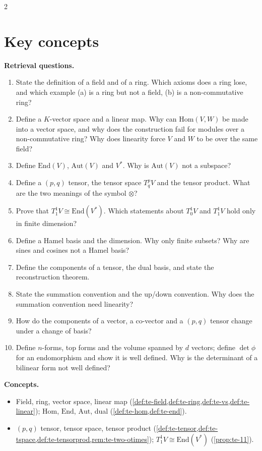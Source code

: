 \begin{paracol}{2}
\section*{Key concepts}
\begin{keyconcepts}
\textbf{Retrieval questions.}
\begin{enumerate}
  \item State the definition of a field and of a ring. Which axioms does a ring lose, and which example (a) is a ring but not a field, (b) is a non-commutative ring?
  \item Define a $K$-vector space and a linear map. Why can $\mathrm{Hom}(V,W)$ be made into a vector space, and why does the construction fail for modules over a non-commutative ring? Why does linearity force $V$ and $W$ to be over the same field?
  \item Define $\mathrm{End}(V)$, $\mathrm{Aut}(V)$ and $V^*$. Why is $\mathrm{Aut}(V)$ not a subspace?
  \item Define a $(p,q)$ tensor, the tensor space $T^p_qV$ and the tensor product. What are the two meanings of the symbol $\otimes$?
  \item Prove that $T^1_1V\cong\mathrm{End}(V^*)$. Which statements about $T^1_0V$ and $T^1_1V$ hold only in finite dimension?
  \item Define a Hamel basis and the dimension. Why only finite subsets? Why are sines and cosines not a Hamel basis?
  \item Define the components of a tensor, the dual basis, and state the reconstruction theorem.
  \item State the summation convention and the up/down convention. Why does the summation convention need linearity?
  \item How do the components of a vector, a co-vector and a $(p,q)$ tensor change under a change of basis?
  \item Define $n$-forms, top forms and the volume spanned by $d$ vectors; define $\det\phi$ for an endomorphism and show it is well defined. Why is the determinant of a bilinear form not well defined?
\end{enumerate}
\textbf{Concepts.}
\begin{itemize}
  \item Field, ring, vector space, linear map (\cref{def:te-field,def:te-ring,def:te-vs,def:te-linear}); $\mathrm{Hom}$, $\mathrm{End}$, $\mathrm{Aut}$, dual (\cref{def:te-hom,def:te-end}).
  \item $(p,q)$ tensor, tensor space, tensor product (\cref{def:te-tensor,def:te-tspace,def:te-tensorprod,rem:te-two-otimes}); $T^1_1V\cong\mathrm{End}(V^*)$ (\cref{prop:te-11}).

\end{itemize}
\end{keyconcepts}
\end{paracol}
